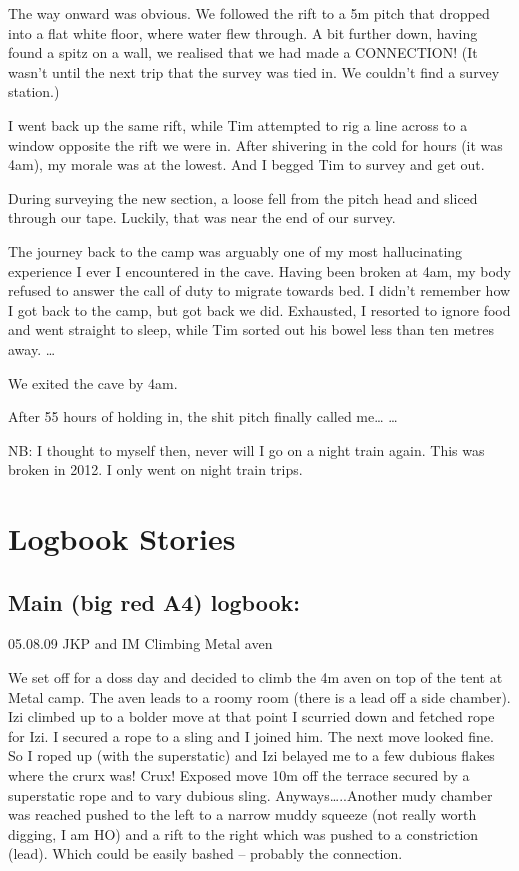 The way onward was obvious. We followed the rift to a 5m pitch that
dropped into a flat white floor, where water flew through. A bit further
down, having found a spitz on a wall, we realised that we had made a
CONNECTION! (It wasn't until the next trip that the survey was tied in.
We couldn't find a survey station.)

I went back up the same rift, while Tim attempted to rig a line across
to a window opposite the rift we were in. After shivering in the cold
for hours (it was 4am), my morale was at the lowest. And I begged Tim to
survey and get out.

During surveying the new section, a loose fell from the pitch head and
sliced through our tape. Luckily, that was near the end of our survey.

The journey back to the camp was arguably one of my most hallucinating
experience I ever I encountered in the cave. Having been broken at 4am,
my body refused to answer the call of duty to migrate towards bed. I
didn't remember how I got back to the camp, but got back we did.
Exhausted, I resorted to ignore food and went straight to sleep, while
Tim sorted out his bowel less than ten metres away. \ldots{}

We exited the cave by 4am.

After 55 hours of holding in, the shit pitch finally called me\ldots{}
\ldots{}

NB: I thought to myself then, never will I go on a night train again.
This was broken in 2012. I only went on night train trips.


\hypertarget{logbook-stories}{%
\section{Logbook Stories}\label{logbook-stories}}

\hypertarget{main-big-red-a4-logbook}{%
\subsection{Main (big red A4) logbook:}\label{main-big-red-a4-logbook}}

05.08.09 JKP and IM Climbing Metal aven

We set off for a doss day and decided to climb the 4m aven on top of the
tent at Metal camp. The aven leads to a roomy room (there is a lead off
a side chamber). Izi climbed up to a bolder move at that point I
scurried down and fetched rope for Izi. I secured a rope to a sling and
I joined him. The next move looked fine. So I roped up (with the
superstatic) and Izi belayed me to a few dubious flakes where the crurx
was! Crux! Exposed move 10m off the terrace secured by a superstatic
rope and to vary dubious sling. Anyways\ldots{}..Another mudy chamber
was reached pushed to the left to a narrow muddy squeeze (not really
worth digging, I am HO) and a rift to the right which was pushed to a
constriction (lead). Which could be easily bashed -- probably the
connection.

